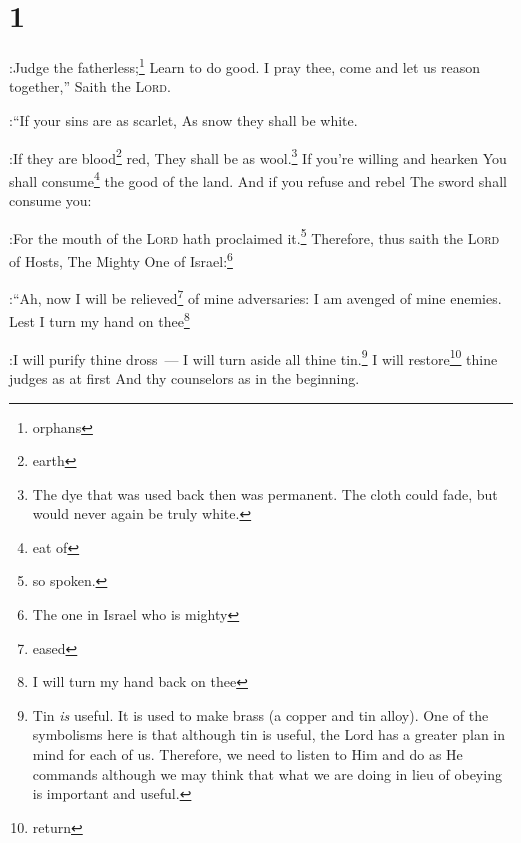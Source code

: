 \section{1}\label{Isaiah 1}
\begin{enumerate}[align=center]
    
    :Judge the fatherless;\footnote{orphans} Learn to do good.%
     I pray thee, come and let us reason together,'' Saith the \textsc{Lord}.%

:``If your sins are as scarlet, As snow they shall be white.%

:If they are blood\footnote{earth} red, They shall be as wool.\footnote{The dye that was used back then was permanent. The cloth could fade, but would never again be truly white.}%
     If you're willing and hearken You shall consume\footnote{eat of} the good of the land.%
     And if you refuse and rebel The sword shall consume you:%

:For the mouth of the \textsc{Lord} hath proclaimed it.\footnote{so spoken.}%
     Therefore, thus saith the \textsc{Lord} of Hosts, The Mighty One of Israel:\footnote{The one in Israel who is mighty}%

:``Ah, now I will be relieved\footnote{eased} of mine adversaries: I am avenged of mine enemies.%
     Lest I turn my hand on thee\footnote{I will turn my hand back on thee}%

:I will purify thine dross~--- I will turn aside all thine tin.\footnote{Tin \emph{is} useful. It is used to make brass (a copper and tin alloy). One of the symbolisms here is that although tin is useful, the Lord has a greater plan in mind for each of us. Therefore, we need to listen to Him and do as He commands although we may think that what we are doing in lieu of obeying is important and useful.}%
     I will restore\footnote{return} thine judges as at first And thy counselors as in the beginning.%


\end{enumerate}
